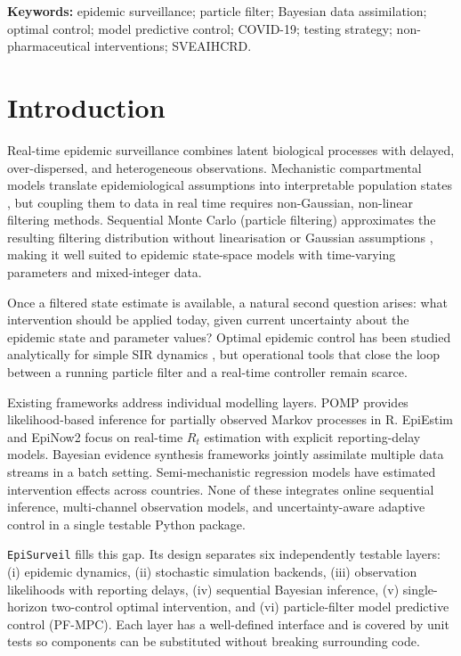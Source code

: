 \documentclass[11pt]{article}
\begin{document}
\noindent\textbf{Keywords:}
epidemic surveillance; particle filter; Bayesian data assimilation;
optimal control; model predictive control; COVID-19; testing strategy;
non-pharmaceutical interventions; SVEAIHCRD.


\section{Introduction}
\label{sec:intro}

Real-time epidemic surveillance combines latent biological processes with
delayed, over-dispersed, and heterogeneous observations.
Mechanistic compartmental models translate epidemiological assumptions into
interpretable population states \cite{anderson1991,keeling2008}, but coupling
them to data in real time requires non-Gaussian, non-linear filtering methods.
Sequential Monte Carlo (particle filtering) approximates the resulting
filtering distribution without linearisation or Gaussian assumptions
\cite{gordon1993,doucet2001,chopin2020}, making it well suited to epidemic
state-space models with time-varying parameters and mixed-integer data.

Once a filtered state estimate is available, a natural second question arises:
what intervention should be applied today, given current uncertainty about the
epidemic state and parameter values?
Optimal epidemic control has been studied analytically for simple SIR dynamics
\cite{bolzoni2017,bliman2021}, but operational tools that close the
loop between a running particle filter and a real-time controller remain scarce.

Existing frameworks address individual modelling layers.
POMP \cite{ionides2006,king2016} provides likelihood-based inference for
partially observed Markov processes in R.
EpiEstim \cite{cori2013} and EpiNow2 \cite{abbott2020} focus on real-time
$R_t$ estimation with explicit reporting-delay models.
Bayesian evidence synthesis frameworks \cite{birrell2021} jointly assimilate
multiple data streams in a batch setting.
Semi-mechanistic regression models \cite{flaxman2020,brauner2021} have
estimated intervention effects across countries.
None of these integrates online sequential inference, multi-channel
observation models, and uncertainty-aware adaptive control in a single
testable Python package.

\texttt{EpiSurveil} fills this gap.
Its design separates six independently testable layers:
(i) epidemic dynamics, (ii) stochastic simulation backends,
(iii) observation likelihoods with reporting delays,
(iv) sequential Bayesian inference,
(v) single-horizon two-control optimal intervention, and
(vi) particle-filter model predictive control (PF-MPC).
Each layer has a well-defined interface and is covered by unit tests
so components can be substituted without breaking surrounding code.
\end{document}
